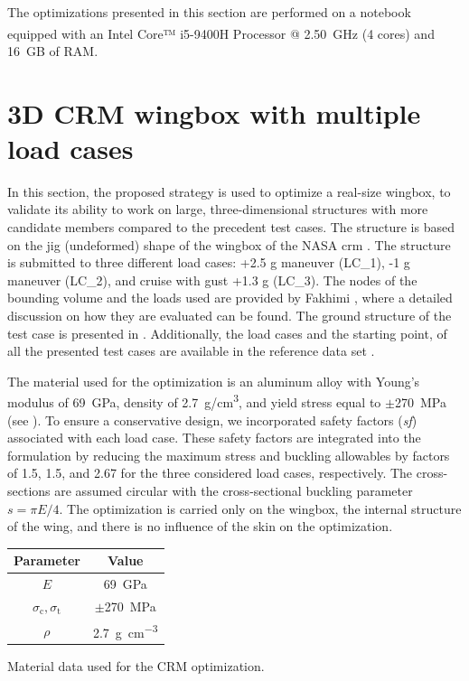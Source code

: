 The optimizations presented in this section are performed on a notebook equipped with an Intel\textsuperscript{\textregistered} Core™ i5-9400H Processor @ \qty{2.50}{GHz} (4 cores) and \qty{16}{GB} of RAM. 

\section{3D CRM wingbox with multiple load cases}
In this section, the proposed strategy is used to optimize a real-size wingbox, to validate its ability to work on large, three-dimensional structures with more candidate members compared to the precedent test cases. The structure is based on the jig (undeformed) shape of the wingbox of the NASA \gls{crm} . The structure is submitted to three different load cases: +2.5 g maneuver (LC\_1), -1 g maneuver (LC\_2), and cruise with gust +1.3 g (LC\_3). The nodes of the bounding volume and the loads used are provided by Fakhimi \etal {}, where a detailed discussion on how they are evaluated can be found. The ground structure of the test case is presented in . Additionally, the load cases and the starting point, of all the presented test cases are available in the reference data set .

The material used for the optimization is an aluminum alloy with Young's modulus of \qty{69}{\GPa}, density of \qty{2.7}{\gram/\cm^3}, and yield stress equal to $\pm$\qty{270}{\MPa} (see ). To ensure a conservative design, we incorporated safety factors (\textit{sf}) associated with each load case. These safety factors are integrated into the formulation by reducing the maximum stress and buckling allowables by factors of 1.5, 1.5, and 2.67 for the three considered load cases, respectively. The cross-sections are assumed circular with the cross-sectional buckling parameter $s = \pi E/4$. The optimization is carried only on the wingbox, the internal structure of the wing, and there is no influence of the skin on the optimization.
\begin{margintable}
    \small
    \centering
    \begin{tabular}{cc}
    \toprule
    \textbf{Parameter}        & \textbf{Value} \\ \midrule
    $E$              & \qty{69}{GPa}     \\
    $\sigma_\text{c}, \sigma_\text{t}$ & $\pm $\qty{270}{MPa} \\
    $\rho$              & \qty{2.7}{\gram\per\cubic\centi\metre}   \\
    \bottomrule
    \end{tabular}
    \caption{Material data used for the CRM optimization.}
    \label{tab:07_CRM_mat}
\end{margintable}

